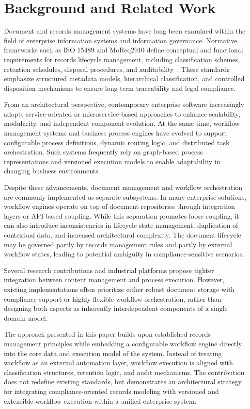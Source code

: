 ﻿%
\section{Background and Related Work}

Document and records management systems have long been examined within the field of enterprise information systems and information governance. 
Normative frameworks such as ISO 15489 and MoReq2010 define conceptual and functional requirements for records lifecycle management, including classification schemes, retention schedules, disposal procedures, and auditability~\cite{iso15489,moreq2010}. 
These standards emphasize structured metadata models, hierarchical classification, and controlled disposition mechanisms to ensure long-term traceability and legal compliance.

From an architectural perspective, contemporary enterprise software increasingly adopts service-oriented or microservice-based approaches to enhance scalability, modularity, and independent component evolution. 
At the same time, workflow management systems and business process engines have evolved to support configurable process definitions, dynamic routing logic, and distributed task orchestration. 
Such systems frequently rely on graph-based process representations and versioned execution models to enable adaptability in changing business environments.

Despite these advancements, document management and workflow orchestration are commonly implemented as separate subsystems. 
In many enterprise solutions, workflow engines operate on top of document repositories through integration layers or API-based coupling. 
While this separation promotes loose coupling, it can also introduce inconsistencies in lifecycle state management, duplication of contextual data, and increased architectural complexity. 
The document lifecycle may be governed partly by records management rules and partly by external workflow states, leading to potential ambiguity in compliance-sensitive scenarios.

Several research contributions and industrial platforms propose tighter integration between content management and process execution. 
However, existing implementations often prioritize either robust document storage with compliance support or highly flexible workflow orchestration, rather than designing both aspects as inherently interdependent components of a single domain model.

The approach presented in this paper builds upon established records management principles while embedding a configurable workflow engine directly into the core data and execution model of the system. 
Instead of treating workflow as an external automation layer, workflow execution is aligned with classification structures, retention logic, and audit mechanisms. 
The contribution does not redefine existing standards, but demonstrates an architectural strategy for integrating compliance-oriented records modeling with versioned and extensible workflow execution within a unified enterprise system.
